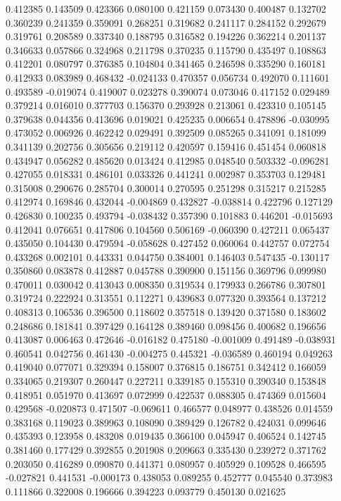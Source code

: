 0.412385
0.143509
0.423366
0.080100
0.421159
0.073430
0.400487
0.132702
0.360239
0.241359
0.359091
0.268251
0.319682
0.241117
0.284152
0.292679
0.319761
0.208589
0.337340
0.188795
0.316582
0.194226
0.362214
0.201137
0.346633
0.057866
0.324968
0.211798
0.370235
0.115790
0.435497
0.108863
0.412201
0.080797
0.376385
0.104804
0.341465
0.246598
0.335290
0.160181
0.412933
0.083989
0.468432
-0.024133
0.470357
0.056734
0.492070
0.111601
0.493589
-0.019074
0.419007
0.023278
0.390074
0.073046
0.417152
0.029489
0.379214
0.016010
0.377703
0.156370
0.293928
0.213061
0.423310
0.105145
0.379638
0.044356
0.413696
0.019021
0.425235
0.006654
0.478896
-0.030995
0.473052
0.006926
0.462242
0.029491
0.392509
0.085265
0.341091
0.181099
0.341139
0.202756
0.305656
0.219112
0.420597
0.159416
0.451454
0.060818
0.434947
0.056282
0.485620
0.013424
0.412985
0.048540
0.503332
-0.096281
0.427055
0.018331
0.486101
0.033326
0.441241
0.002987
0.353703
0.129481
0.315008
0.290676
0.285704
0.300014
0.270595
0.251298
0.315217
0.215285
0.412974
0.169846
0.432044
-0.004869
0.432827
-0.038814
0.422796
0.127129
0.426830
0.100235
0.493794
-0.038432
0.357390
0.101883
0.446201
-0.015693
0.412041
0.076651
0.417806
0.104560
0.506169
-0.060390
0.427211
0.065437
0.435050
0.104430
0.479594
-0.058628
0.427452
0.060064
0.442757
0.072754
0.433268
0.002101
0.443331
0.044750
0.384001
0.146403
0.547435
-0.130117
0.350860
0.083878
0.412887
0.045788
0.390900
0.151156
0.369796
0.099980
0.470011
0.030042
0.413043
0.008350
0.319534
0.179933
0.266786
0.307801
0.319724
0.222924
0.313551
0.112271
0.439683
0.077320
0.393564
0.137212
0.408313
0.106536
0.396500
0.118602
0.357518
0.139420
0.371580
0.183602
0.248686
0.181841
0.397429
0.164128
0.389460
0.098456
0.400682
0.196656
0.413087
0.006463
0.472646
-0.016182
0.475180
-0.001009
0.491489
-0.038931
0.460541
0.042756
0.461430
-0.004275
0.445321
-0.036589
0.460194
0.049263
0.419040
0.077071
0.329394
0.158007
0.376815
0.186751
0.342412
0.166059
0.334065
0.219307
0.260447
0.227211
0.339185
0.155310
0.390340
0.153848
0.418951
0.051970
0.413697
0.072999
0.422537
0.088305
0.474369
0.015604
0.429568
-0.020873
0.471507
-0.069611
0.466577
0.048977
0.438526
0.014559
0.383168
0.119023
0.389963
0.108090
0.389429
0.126782
0.424031
0.099646
0.435393
0.123958
0.483208
0.019435
0.366100
0.045947
0.406524
0.142745
0.381460
0.177429
0.392855
0.201908
0.209663
0.335430
0.239272
0.371762
0.203050
0.416289
0.090870
0.441371
0.080957
0.405929
0.109528
0.466595
-0.027821
0.441531
-0.000173
0.438053
0.089255
0.452777
0.045540
0.373983
0.111866
0.322008
0.196666
0.394223
0.093779
0.450130
0.021625

